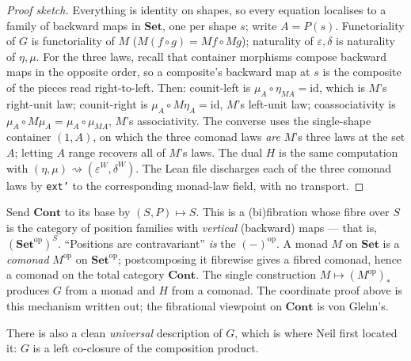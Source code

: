 \documentclass[11pt,a4paper]{book}
\newcommand{\Set}{\mathbf{Set}}
\newcommand{\Cont}{\mathbf{Cont}}
\newcommand{\id}{\mathrm{id}}
\theoremstyle{plain}
\theoremstyle{definition}
\theoremstyle{remark}
\begin{document}
\begin{proof}[Proof sketch]
Everything is identity on shapes, so every equation localises to a family of backward maps in
$\Set$, one per shape $s$; write $A=P(s)$. Functoriality of $G$ is functoriality of $M$
($M(f\circ g)=Mf\circ Mg$); naturality of $\varepsilon,\delta$ is naturality of $\eta,\mu$.
For the three laws, recall that container morphisms compose backward maps in the opposite order,
so a composite's backward map at $s$ is the composite of the pieces read right-to-left. Then:
counit-left is $\mu_{A}\circ\eta_{MA}=\id$, which is $M$'s right-unit law; counit-right is
$\mu_{A}\circ M\eta_{A}=\id$, $M$'s left-unit law; coassociativity is
$\mu_{A}\circ M\mu_{A}=\mu_{A}\circ\mu_{MA}$, $M$'s associativity. The converse uses the
single-shape container $(1,A)$, on which the three comonad laws \emph{are} $M$'s three laws at
the set $A$; letting $A$ range recovers all of $M$'s laws. The dual $H$ is the same computation
with $(\eta,\mu)\rightsquigarrow(\varepsilon^{W},\delta^{W})$. The Lean file discharges each of
the three comonad laws by \texttt{ext'} to the corresponding monad-law field, with no transport.
\end{proof}

\begin{teachbox}
Send $\Cont$ to its base by $(S,P)\mapsto S$. This is a (bi)fibration whose fibre over $S$ is the
category of position families with \emph{vertical} (backward) maps --- that is,
$(\Set^{\mathrm{op}})^{S}$. ``Positions are contravariant'' \emph{is} the $(-)^{\mathrm{op}}$. A
monad $M$ on $\Set$ is a \emph{comonad} $M^{\mathrm{op}}$ on $\Set^{\mathrm{op}}$; postcomposing
it fibrewise gives a fibred comonad, hence a comonad on the total category $\Cont$. The single
construction $M\mapsto(M^{\mathrm{op}})_{*}$ produces $G$ from a monad and $H$ from a comonad. The
coordinate proof above is this mechanism written out; the fibrational viewpoint on $\Cont$ is von
Glehn's.
\end{teachbox}

There is also a clean \emph{universal} description of $G$, which is where Neil first located it:
$G$ is a left co-closure of the composition product.
\end{document}
